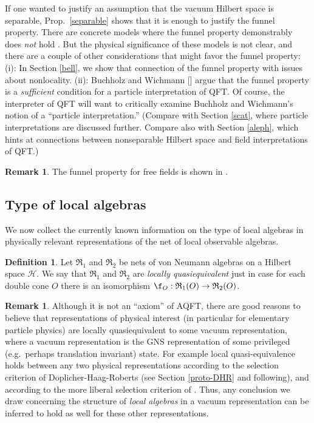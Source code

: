 \documentclass[11pt]{article}
\newcommand{\alg}[1]{\mathfrak{#1}}
\theoremstyle{definition}
\theoremstyle{definition}
\newtheorem{defn}[thm]{Definition}
\newtheorem{note}[thm]{Remark}
\theoremstyle{remark}
\def\2#1{{\mathcal #1}}
\begin{document}
If one wanted to justify an assumption that the vacuum
Hilbert space is separable, Prop.\ \ref{separable}
shows that it is enough to justify the funnel property.
There are concrete models where the funnel property
demonstrably does \emph{not} hold \cite[p.\
23]{horuzhy}.  But the physical significance of these
models is not clear, and there are a couple of other
considerations that might favor the funnel property:
(i): In Section \ref{bell}, we show that connection of
the funnel property with issues about nonlocality.
(ii): Buchholz and Wichmann [\citeyear{bucwic}] argue
that the funnel property is a \emph{sufficient}
condition for a particle interpretation of QFT.  Of
course, the interpreter of QFT will want to critically
examine Buchholz and Wichmann's notion of a ``particle
interpretation.'' (Compare with Section \ref{scat},
where particle interpretations are discussed further.
Compare also with Section \ref{aleph}, which hints at
connections between nonseparable Hilbert space and
field interpretations of QFT.)


\begin{note} The funnel property for free fields is shown in
  \cite{pstates}.
\end{note}


\subsection{Type of local algebras} \label{type-loc}

We now collect the currently known information on the type of local algebras in
physically relevant representations of the net of local observable algebras.

\begin{defn} Let $\alg{R}_1$ and $\alg{R}_2$ be nets of von Neumann algebras on a
  Hilbert space $\2H$.  We say that $\alg{R}_1$ and $\alg{R}_2$ are \emph{locally
    quasiequivalent} just in case for each double cone $O$ there is an isomorphism
  $\f _O:\alg{R}_1(O)\to \alg{R}_2(O)$.  \end{defn}

\begin{note} Although it is not an ``axiom'' of AQFT, there are good
  reasons to believe that representations of physical interest (in
  particular for elementary particle physics) are locally
  quasiequivalent to some vacuum representation, where a vacuum
  representation is the GNS representation of some privileged (e.g.\
  perhaps translation invariant) state.  For example local
  quasi-equivalence holds between any two physical representations
  according to the selection criterion of Doplicher-Haag-Roberts (see
  Section \ref{proto-DHR} and following), and according to the more
  liberal selection criterion of \cite{buch-fred}.  Thus, any
  conclusion we draw concerning the structure of \emph{local algebras}
  in a vacuum representation can be inferred to hold as well for these
  other representations.
\end{note}
\end{document}
